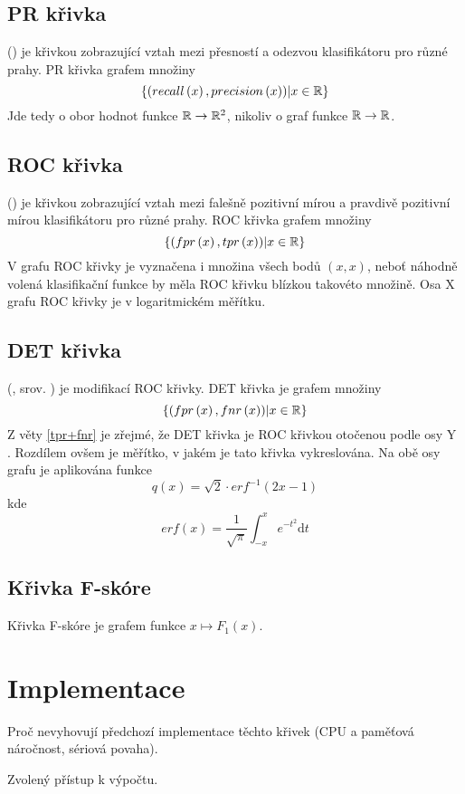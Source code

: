 \subsection{PR křivka}
 () je křivkou zobrazující vztah mezi přesností a odezvou klasifikátoru pro různé prahy. PR křivka grafem množiny
\[ \left\{ \left( recall \left( x \right), precision \left( x \right) \right) \middle| x \in \mathbb R \right\} \]
Jde tedy o obor hodnot funkce \( \mathbb R \to \mathbb R^2 \), nikoliv o graf funkce \( \mathbb R \to \mathbb R \).

\subsection{ROC křivka}
 () je křivkou zobrazující vztah mezi falešně pozitivní mírou a pravdivě pozitivní mírou klasifikátoru pro různé prahy. ROC křivka grafem množiny
\[ \left\{ \left( fpr \left( x \right), tpr \left( x \right) \right) \middle| x \in \mathbb R \right\} \]
V grafu ROC křivky je vyznačena i množina všech bodů \( \left( x, x \right) \), neboť náhodně volená klasifikační funkce by měla ROC křivku blízkou takovéto množině. Osa X grafu ROC křivky je v logaritmickém měřítku.

\subsection{DET křivka}
 (, srov. \cite{martin_det_1997}) je modifikací ROC křivky. DET křivka je grafem množiny
\[ \left\{ \left( fpr \left( x \right), fnr \left( x \right) \right) \middle| x \in \mathbb R \right\} \]
Z věty \ref{tpr+fnr} je zřejmé, že DET křivka je ROC křivkou otočenou podle osy Y . Rozdílem ovšem je měřítko, v jakém je tato křivka vykreslována. Na obě osy grafu je aplikována funkce
\[ q \left( x \right) = \sqrt{2} \cdot erf^{-1} \left( 2x - 1 \right) \]
kde
\[ erf \left( x \right) = \frac{1}{\sqrt{\pi}} \int_{-x}^{x} e^{-t^2} \mathrm{d} t \]

\subsection{Křivka F-skóre}
Křivka F-skóre je grafem funkce \( x \mapsto F_1 \left( x \right) \).

\section{Implementace}
Proč nevyhovují předchozí implementace těchto křivek (CPU a paměťová náročnost, sériová povaha).

Zvolený přístup k výpočtu.
